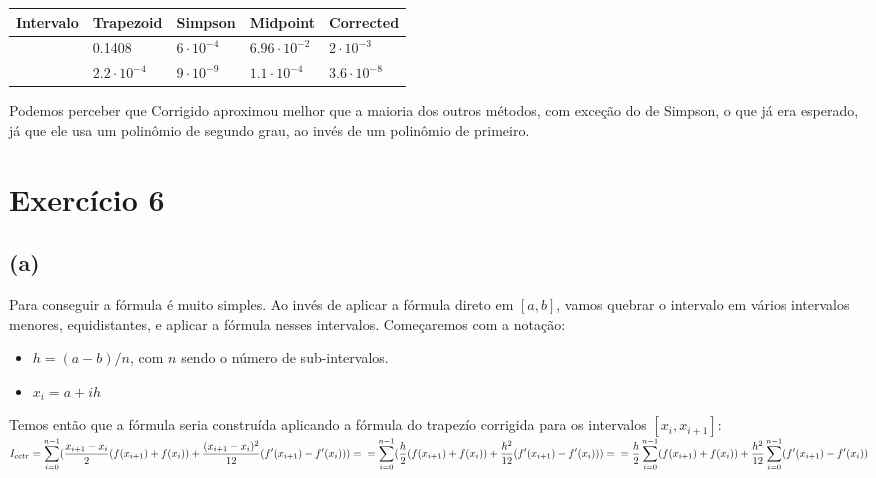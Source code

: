 \documentclass[11pt]{article}
\begin{document}
\begin{center}
\begin{tabular}{lllll}
\hline
Intervalo & Trapezoid & Simpson & Midpoint & Corrected\\
\hline
\hline
[0, 1] & 0.1408 & \(6\cdot 10^{-4}\) & \(6.96\cdot 10^{-2}\) & \(2\cdot 10^{-3}\)\\
\hline
[0.9, 1] & \(2.2\cdot 10^{-4}\) & \(9\cdot 10^{-9}\) & \(1.1\cdot 10^{-4}\) & \(3.6\cdot 10^{-8}\)\\
\hline
\hline
\end{tabular}
\end{center}

Podemos perceber que Corrigido aproximou melhor que a maioria dos outros métodos, com exceção do de Simpson,
o que já era esperado, já que ele usa um polinômio de segundo grau, ao invés de um polinômio de primeiro.

\newpage

\section{Exercício 6}
\label{sec:org83bf0d2}
\subsection{(a)}
\label{sec:org483ce4d}
Para conseguir a fórmula é muito simples. Ao invés de aplicar a fórmula direto
em \([a, b]\), vamos quebrar o intervalo em vários intervalos menores, equidistantes,
e aplicar a fórmula nesses intervalos.
Começaremos com a notação:

\begin{itemize}
\item \(h = (a-b)/n\), com \(n\) sendo o número de sub-intervalos.
\item \(x_i = a + ih\)
\end{itemize}

Temos então que a fórmula seria construída aplicando a fórmula do trapezío corrigida
para os intervalos \([x_{i}, x_{i+1}]\): \\

\(\displaystyle I_{cctr} = \sum_{i=0}^{n-1}(\frac{x_{i+1}-x_i}{2}(f(x_{i+1})+f(x_i))+\frac{(x_{i+1}-x_i)^2}{12}(f'(x_{i+1})-f'(x_i))) = \\
   = \sum_{i=0}^{n-1}(\frac{h}{2}(f(x_{i+1})+f(x_i))+\frac{h^2}{12}(f'(x_{i+1})-f'(x_i))) = \\
   = \frac{h}{2}\sum_{i=0}^{n-1}(f(x_{i+1})+f(x_i)) + \frac{h^2}{12}\sum_{i=0}^{n-1}(f'(x_{i+1})-f'(x_i))\)
\end{document}
